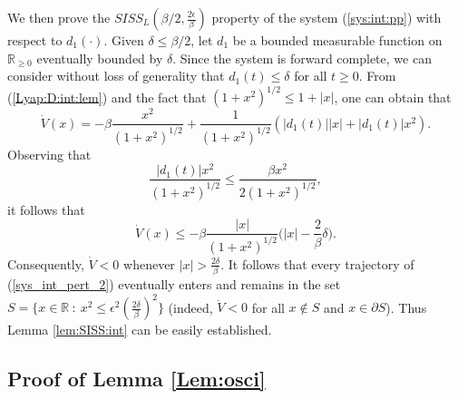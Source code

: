 \documentclass[letterpaper, 10pt]{article}
\newcommand{\rref}[1]{(\ref{#1})}
\newcommand{\abs}[1]{\left| #1 \right|}
\newcommand{\reels}{\mathbb{R}}
\begin{document}
We then prove  the $ SISS_L (  \beta / 2 , \frac{ 2 \epsilon }{ \beta } )$ property of the system \rref{sys:int:pp} with respect to $d_1(\cdot)$.
Given $\delta \leq   \beta / 2 $, let $d_1$ be a bounded measurable function on $\reels_{\geq 0}$ eventually bounded by $\delta$. Since the system is forward complete, we can consider without loss of generality that
$d_1(t) \leq \delta $ for all $t \geq 0$. From \rref{Lyap:D:int:lem} and the fact that $(1+ x^2)^{1/2}  \leq 1 + \abs{x }$, one can obtain that
\begin{equation*}
\dot{V}(x) = - \beta  \frac{x^2}{(1+ x^2)^{1/2}}   + \frac{1 }{(1+ x^2)^{1/2}} ( \abs{d_1(t) } \abs{ x } +   \abs{d_1(t) } x^2 ).
\end{equation*}
Observing that 
\begin{equation}
 \frac{  \abs{d_1(t) } x^2 }{(1+ x^2)^{1/2}}  \leq   \frac{ \beta  x^2}{2(1+ x^2)^{1/2}}   ,
\end{equation}
it follows that
\begin{equation}
\dot{V}(x) \leq  -  \beta \frac{\abs{x} }{(1+ x^2)^{1/2}} \big( \abs{x} - \frac{ 2}{ \beta} \delta  \big) .
\end{equation} 
Consequently, $\dot{V} < 0$ whenever $ \abs{x} >  \frac{ 2 \delta }{ \beta}$. It follows that every trajectory of \rref{sys_int_pert_2} eventually enters and remains in the set $S= \lbrace x \in \reels \: : \: x^2 \leq \epsilon^2 ( \frac{ 2 \delta }{  \beta })^2 \rbrace$ (indeed, $\dot{V} < 0$ for all $x \notin S$ and $x \in \partial S$). Thus Lemma \ref{lem:SISS:int} can be easily established.



\subsection{Proof of Lemma \ref{Lem:osci}}
\end{document}
